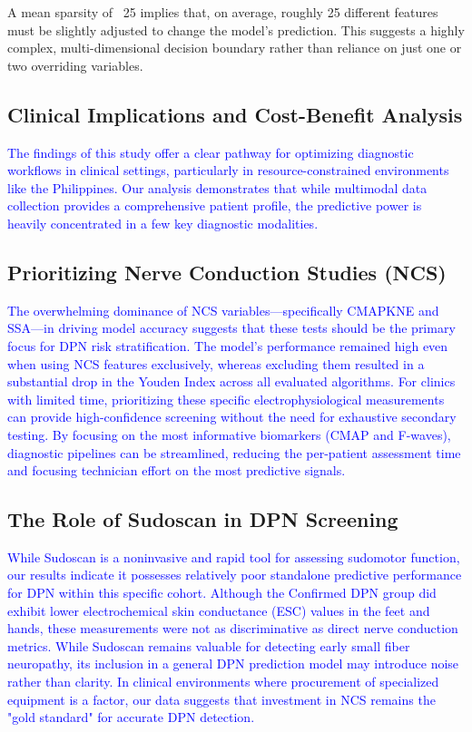 \documentclass[fleqn,10pt]{wlscirep}
\begin{document}
A mean sparsity of ~25 implies that, on average, roughly 25 different features must be slightly adjusted to change the model's prediction. This suggests a highly complex, multi-dimensional decision boundary rather than reliance on just one or two overriding variables.

\subsection*{Clinical Implications and Cost-Benefit Analysis}
\textcolor{blue}{The findings of this study offer a clear pathway for optimizing diagnostic workflows in clinical settings, particularly in resource-constrained environments like the Philippines. Our analysis demonstrates that while multimodal data collection provides a comprehensive patient profile, the predictive power is heavily concentrated in a few key diagnostic modalities.}

\subsection*{Prioritizing Nerve Conduction Studies (NCS)}
\textcolor{blue}{The overwhelming dominance of NCS variables—specifically CMAPKNE and SSA—in driving model accuracy suggests that these tests should be the primary focus for DPN risk stratification. The model's performance remained high even when using NCS features exclusively, whereas excluding them resulted in a substantial drop in the Youden Index across all evaluated algorithms. For clinics with limited time, prioritizing these specific electrophysiological measurements can provide high-confidence screening without the need for exhaustive secondary testing. By focusing on the most informative biomarkers (CMAP and F-waves), diagnostic pipelines can be streamlined, reducing the per-patient assessment time and focusing technician effort on the most predictive signals.}

\subsection*{The Role of Sudoscan in DPN Screening}
\textcolor{blue}{While Sudoscan is a noninvasive and rapid tool for assessing sudomotor function, our results indicate it possesses relatively poor standalone predictive performance for DPN within this specific cohort. Although the Confirmed DPN group did exhibit lower electrochemical skin conductance (ESC) values in the feet and hands, these measurements were not as discriminative as direct nerve conduction metrics. While Sudoscan remains valuable for detecting early small fiber neuropathy, its inclusion in a general DPN prediction model may introduce noise rather than clarity. In clinical environments where procurement of specialized equipment is a factor, our data suggests that investment in NCS remains the "gold standard" for accurate DPN detection.}
\end{document}
